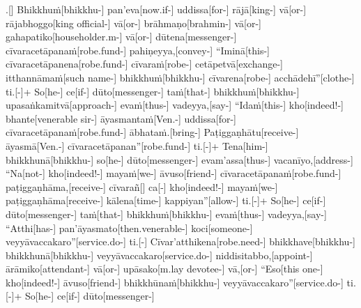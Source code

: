 \documentclass[12pt]{article}
\begin{document}
\begin{paracol}{2}
\begin{column}
\switchcolumn


\begin{flushleft}
.[] Bhikkhuṁ[bhikkhu-] pan’eva[now.if-] uddissa[for-] rājā[king-] vā[or-] rājabhoggo[king official-] vā[or-] brāhmaṇo[brahmin-] vā[or-] gahapatiko[householder.m-] vā[or-] dūtena[messenger-] cīvaracetāpanaṁ[robe.fund-] pahiṇeyya,[convey-] “Iminā[this-] cīvaracetāpanena[robe.fund-] cīvaraṁ[robe-] cetāpetvā[exchange-] itthannāmaṁ[such name-] bhikkhuṁ[bhikkhu-] cīvarena[robe-] acchādehī”[clothe-] ti.[-\NUL{\GMU{}}]+ So[he-] ce[if-\NUL{\GMU{}}] dūto[messenger-] taṁ[that-] bhikkhuṁ[bhikkhu-] upasaṅkamitvā[approach-] evaṁ[thus-] vadeyya,[say-] “Idaṁ[this-] kho[indeed!-] bhante[venerable sir-] āyasmantaṁ[Ven.-] uddissa[for-] cīvaracetāpanaṁ[robe.fund-] ābhataṁ.[bring-] Paṭiggaṇhātu[receive-] āyasmā[Ven.-] cīvaracetāpanan”[robe.fund-] ti.[-\NUL{\GMU{}}]+ Tena[him-] bhikkhunā[bhikkhu-] so[he-] dūto[messenger-] evam’assa[thus-] vacanīyo,[address-] “Na[not-] kho[indeed!-] mayaṁ[we-] āvuso[friend-] cīvaracetāpanaṁ[robe.fund-] paṭiggaṇhāma,[receive-] cīvarañ[] ca[-\NUL{\GMU{}}] kho[indeed!-] mayaṁ[we-] paṭiggaṇhāma[receive-] kālena[time-] kappiyan”[allow-] ti.[-\NUL{\GMU{}}]+ So[he-] ce[if-\NUL{\GMU{}}] dūto[messenger-] taṁ[that-] bhikkhuṁ[bhikkhu-] evaṁ[thus-] vadeyya,[say-] “Atthi[has-] pan’āyasmato[then.venerable-] koci[someone-] veyyāvaccakaro”[service.do-] ti.[-\NUL{\GMU{}}] Cīvar’atthikena[robe.need-] bhikkhave[bhikkhu-] bhikkhunā[bhikkhu-] veyyāvaccakaro[service.do-] niddisitabbo,[appoint-] ārāmiko[attendant-] vā[or-] upāsako[m.lay devotee-] vā,[or-] “Eso[this one-] kho[indeed!-] āvuso[friend-] bhikkhūnaṁ[bhikkhu-] veyyāvaccakaro”[service.do-] ti.[-\NUL{\GMU{}}]+ So[he-] ce[if-\NUL{\GMU{}}] dūto[messenger-] 
\end{flushleft}
\end{column}
\end{paracol}
\end{document}
